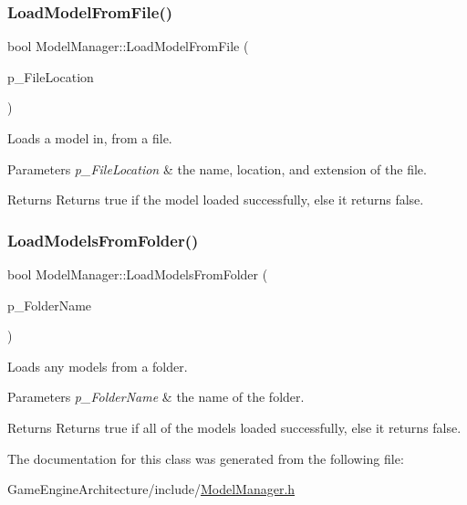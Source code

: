 \subsubsection{\texorpdfstring{LoadModelFromFile()}{LoadModelFromFile()}\hspace{0.1cm}{\footnotesize\ttfamily [2/2]}}
{\footnotesize\ttfamily bool Model\+Manager\+::\+Load\+Model\+From\+File (\begin{DoxyParamCaption}\item[{const \mbox{\hyperlink{struct_file_information}{File\+Information}} \&}]{p\+\_\+\+File\+Location }\end{DoxyParamCaption})\hspace{0.3cm}{\ttfamily [inline]}}



Loads a model in, from a file. 


\begin{DoxyParams}{Parameters}
{\em p\+\_\+\+File\+Location} & the name, location, and extension of the file. \\
\hline
\end{DoxyParams}
\begin{DoxyReturn}{Returns}
Returns true if the model loaded successfully, else it returns false. 
\end{DoxyReturn}
\mbox{\label{class_model_manager_ab94a71bd3c3a8c9546947686861e1d8b}} 
\subsubsection{\texorpdfstring{LoadModelsFromFolder()}{LoadModelsFromFolder()}}
{\footnotesize\ttfamily bool Model\+Manager\+::\+Load\+Models\+From\+Folder (\begin{DoxyParamCaption}\item[{const std\+::string \&}]{p\+\_\+\+Folder\+Name }\end{DoxyParamCaption})\hspace{0.3cm}{\ttfamily [inline]}}



Loads any models from a folder. 


\begin{DoxyParams}{Parameters}
{\em p\+\_\+\+Folder\+Name} & the name of the folder. \\
\hline
\end{DoxyParams}
\begin{DoxyReturn}{Returns}
Returns true if all of the models loaded successfully, else it returns false. 
\end{DoxyReturn}


The documentation for this class was generated from the following file\+:\begin{DoxyCompactItemize}
\item 
Game\+Engine\+Architecture/include/\mbox{\hyperlink{_model_manager_8h}{Model\+Manager.\+h}}\end{DoxyCompactItemize}
